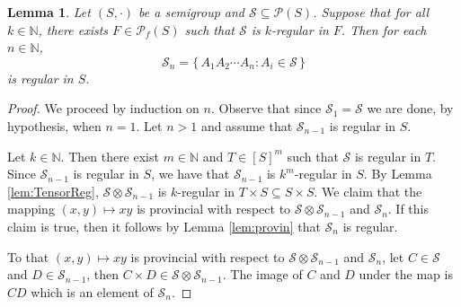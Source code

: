 \documentclass[12pt]{article}
\theoremstyle{plain}
\newtheorem{lem}[thm]{Lemma}
\theoremstyle{definition}
\newcommand{\bbN}{\mathbb{N}}
\newcommand{\calP}{\mathcal{P}}
\newcommand{\calS}{\mathcal{S}}
\newcommand{\Pf}{\mathcal{P}_f}
\begin{document}
\begin{lem}
  Let $(S, \cdot)$ be a semigroup and $\calS \subseteq \calP(S)$.
  Suppose that for all $k \in \bbN$, there exists $F \in \Pf(S)$ such
  that $\calS$ is \mbox{$k$-regular} in $F$.
  Then for each $n \in \bbN$,
  \[
    \calS_n = \{\, A_1A_2 \cdots A_n : A_i \in \calS \,\}
  \]
  is regular in $S$.
\end{lem}
\begin{proof}
  We proceed by induction on $n$. 
  Observe that since $\calS_1 = \calS$ we are done, by hypothesis,
  when $n = 1$.
  Let $n > 1$ and assume that $\calS_{n-1}$ is regular in $S$.

  Let $k \in \bbN$.
  Then there exist $m \in \bbN$ and $T \in [S]^m$ such that $\calS$ is
  regular in $T$.
  Since $\calS_{n-1}$ is regular in $S$, we have that $\calS_{n-1}$ is
  \mbox{$k^m$-regular} in $S$.
  By Lemma \ref{lem:TensorReg}, $\calS \otimes \calS_{n-1}$ is
  \mbox{$k$-regular} in $T \times S \subseteq S \times S$.
  We claim that the mapping $(x,y) \mapsto xy$ is provincial with
  respect to $\calS \otimes \calS_{n-1}$ and $\calS_n$. 
  If this claim is true, then it follows by Lemma \ref{lem:provin}
  that $\calS_n$ is regular.

  To that $(x,y) \mapsto xy$ is provincial with respect to $\calS
  \otimes \calS_{n-1}$ and $\calS_n$, let $C \in \calS$ and $D \in
  \calS_{n-1}$, then $C \times D \in \calS \otimes \calS_{n-1}$.
  The image of $C$ and $D$ under the map is $CD$ which is an element
  of $\calS_n$.
\end{proof}


\end{document}
